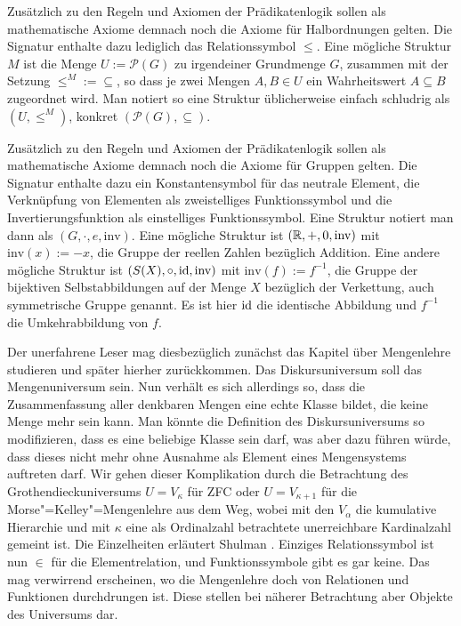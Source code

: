  Zusätzlich zu
den Regeln und Axiomen der Prädikatenlogik sollen als mathematische Axiome
demnach noch die Axiome für Halbordnungen gelten. Die Signatur enthalte
dazu lediglich das Relationssymbol $\le$. Eine mögliche Struktur $M$
ist die Menge $U:=\mathcal P(G)$ zu irgendeiner Grundmenge $G$, zusammen
mit der Setzung ${\le^M} := {\subseteq}$, so dass je zwei Mengen $A,B\in U$
ein Wahrheitswert $A\subseteq B$ zugeordnet wird. Man notiert so
eine Struktur üblicherweise einfach schludrig als $(U,\le^M)$,
konkret $(\mathcal P(G),\subseteq)$.

 Zusätzlich
zu den Regeln und Axiomen der Prädikatenlogik sollen als mathematische Axiome
demnach noch die Axiome für Gruppen gelten. Die Signatur enthalte
dazu ein Konstantensymbol für das neutrale Element, die Verknüpfung von
Elementen als zweistelliges Funktionssymbol und die Invertierungsfunktion
als einstelliges Funktionssymbol. Eine Struktur notiert man dann als
$(G,\cdot,e,\mathrm{inv})$. Eine mögliche Struktur ist $(\mathbb R,+,0,\mathrm{inv})$
mit $\mathrm{inv}(x):=-x$, die Gruppe der reellen Zahlen bezüglich
Addition. Eine andere mögliche Struktur ist $(S(X),\circ,\operatorname{id},\mathrm{inv})$
mit $\mathrm{inv}(f):=f^{-1}$, die Gruppe der bijektiven Selbstabbildungen
auf der Menge $X$ bezüglich der Verkettung, auch symmetrische Gruppe
genannt. Es ist hier $\operatorname{id}$ die identische Abbildung und $f^{-1}$
die Umkehrabbildung von $f$.

 Der unerfahrene Leser mag
diesbezüglich zunächst das Kapitel über Mengenlehre studieren und später
hierher zurückkommen. Das Diskursuniversum soll das Mengenuniversum sein.
Nun verhält es sich allerdings so, dass die Zusammenfassung aller denkbaren
Mengen eine echte Klasse bildet, die keine Menge mehr sein kann. Man
könnte die Definition des Diskursuniversums so modifizieren, dass es eine
beliebige Klasse sein darf, was aber dazu führen würde, dass dieses
nicht mehr ohne Ausnahme als Element eines Mengensystems auftreten darf.
Wir gehen dieser Komplikation durch die Betrachtung des
Grothendieckuniversums $U=V_\kappa$ für ZFC oder $U=V_{\kappa+1}$ für
die Morse"=Kelley"=Mengenlehre aus dem Weg, wobei mit den $V_\alpha$ die
kumulative Hierarchie und mit $\kappa$ eine als Ordinalzahl betrachtete
unerreichbare Kardinalzahl gemeint ist. Die Einzelheiten erläutert
Shulman \cite{Shulman}. Einziges Relationssymbol ist nun  ${\in}$ für
die Elementrelation, und Funktionssymbole gibt es gar keine. Das mag
verwirrend erscheinen, wo die Mengenlehre doch von Relationen und
Funktionen durchdrungen ist. Diese stellen bei näherer Betrachtung aber
Objekte des Universums dar.


